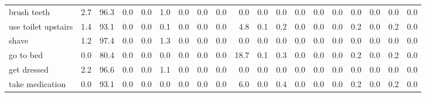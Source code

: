 \documentclass{article}
\begin{document}
\begin{sideways}
\begin{tabular}{lrrrrrrrrrrrrrrrrrr}
brush teeth                   &         2.7 &               96.3 &           0.0 &                          0.0 &                1.0 &                0.0 &                        0.0 &          0.0 &              0.0 &                0.0 &                    0.0 &                      0.0 &                  0.0 &                   0.0 &              0.0 &              0.0 &                                  0.0 &          0.0 \\
use toilet upstairs           &         1.4 &               93.1 &           0.0 &                          0.0 &                0.1 &                0.0 &                        0.0 &          0.0 &              4.8 &                0.1 &                    0.2 &                      0.0 &                  0.0 &                   0.0 &              0.2 &              0.0 &                                  0.2 &          0.0 \\
shave                         &         1.2 &               97.4 &           0.0 &                          0.0 &                1.3 &                0.0 &                        0.0 &          0.0 &              0.0 &                0.0 &                    0.0 &                      0.0 &                  0.0 &                   0.0 &              0.0 &              0.0 &                                  0.0 &          0.0 \\
go to bed                     &         0.0 &               80.4 &           0.0 &                          0.0 &                0.0 &                0.0 &                        0.0 &          0.0 &             18.7 &                0.1 &                    0.3 &                      0.0 &                  0.0 &                   0.0 &              0.2 &              0.0 &                                  0.2 &          0.0 \\
get dressed                   &         2.2 &               96.6 &           0.0 &                          0.0 &                1.1 &                0.0 &                        0.0 &          0.0 &              0.0 &                0.0 &                    0.0 &                      0.0 &                  0.0 &                   0.0 &              0.0 &              0.0 &                                  0.0 &          0.0 \\
take medication               &         0.0 &               93.1 &           0.0 &                          0.0 &                0.0 &                0.0 &                        0.0 &          0.0 &              6.0 &                0.0 &                    0.4 &                      0.0 &                  0.0 &                   0.0 &              0.2 &              0.0 &                                  0.2 &          0.0 \\

\end{tabular}
\end{sideways}
\end{document}
